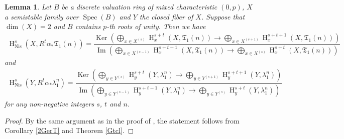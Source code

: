 \documentclass{article}
\newtheorem{lem}[thm]{\indent \sc Lemma}
\newcommand{\spec}{\operatorname{Spec}}
\newcommand{\Nis}{\mathrm{Nis}}
\newcommand{\HO}{\operatorname{H}}
\begin{document}
%
\begin{lem}\upshape\label{HrG}
Let $B$ be a discrete valuation ring of mixed characteristic $(0, p)$, $X$
a semistable family over $\spec(B)$ and $Y$ the closed fiber of $X$. 
Suppose that $\operatorname{dim}(X)=2$
and $B$ contains $p$-th roots of unity. Then we have
%
\begin{align*}
\HO^{s}_{\Nis}(
X, R^{t}\alpha_{*}\mathfrak{T}_{1}(n)
)
=
\dfrac{\operatorname{Ker}\left(
\displaystyle
\bigoplus_{x\in X^{(s)}}\HO^{s+t}_{x}(X, \mathfrak{T}_{1}(n))
\to
\bigoplus_{x\in X^{(s+1)}}\HO^{s+t+1}_{x}(X, \mathfrak{T}_{1}(n))
\right)}
{\operatorname{Im}
\left(
\displaystyle
\bigoplus_{x\in X^{(s-1)}}\HO^{s+t-1}_{x}(X, \mathfrak{T}_{1}(n))
\to
\bigoplus_{x\in X^{(s)}}\HO^{s+t}_{x}(X, \mathfrak{T}_{1}(n))
\right)
}
\end{align*}
%
and
%
\begin{align*}
\HO^{s}_{\Nis}(
Y, 
R^{t}\alpha_{*}\lambda_{1}^{n}
)    
=
\dfrac{\operatorname{Ker}\left(
\displaystyle
\bigoplus_{y\in Y^{(s)}}\HO^{s+t}_{y}(Y, \lambda_{1}^{n}
)
\to
\bigoplus_{y\in Y^{(s+1)}}\HO^{s+t+1}_{y}(Y, \lambda_{1}^{n}
)
\right)}
{\operatorname{Im}
\left(
\displaystyle
\bigoplus_{y\in Y^{(s-1)}}\HO^{s+t-1}_{y}(Y, \lambda_{1}^{n})
\to
\bigoplus_{y\in Y^{(s)}}\HO^{s+t}_{y}(Y, \lambda_{1}^{n})
\right)
}
\end{align*}
%
for any non-negative integers $s$, $t$ and $n$.
\end{lem}
%

%
\begin{proof}\upshape
By the same argument as in the proof of \cite[Lemma 5.3]{Sak5},
the statement follows from Corollary \ref{2GerT} and Theorem \ref{Gtcl}.
\end{proof}
%
\end{document}

